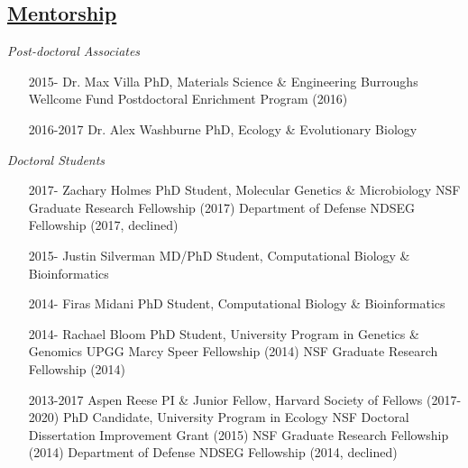 \documentclass[overlapped,line,11pt]{res}
\begin{document}
\begin{resume}
\section{\underline{\sc Mentorship}}
\vspace{.1in}

\emph{Post-doctoral Associates}
\vspace{.1in}

\begin{itemize}[leftmargin=2cm, style=sameline, itemsep=0mm]

\item[2015-] Dr. Max Villa \newline 
  PhD, Materials Science \& Engineering \newline
  Burroughs Wellcome Fund Postdoctoral Enrichment Program (2016)
\item[2016-2017] Dr. Alex Washburne \newline 
  PhD, Ecology \& Evolutionary Biology 
  
  
\end{itemize}

\vspace{-.1in}
\emph{Doctoral Students}
\vspace{.1in}

\begin{itemize}[leftmargin=2cm, style=sameline, itemsep=0mm]

\item[2017-] Zachary Holmes \newline 
  PhD Student, Molecular Genetics \& Microbiology \newline
  NSF Graduate Research Fellowship (2017) \newline
  Department of Defense NDSEG Fellowship (2017, declined) 
\item[2015-] Justin Silverman \newline 
  MD/PhD Student, Computational Biology \& Bioinformatics
\item[2014-] Firas Midani \newline 
  PhD Student, Computational Biology \& Bioinformatics
\item[2014-] Rachael Bloom \newline 
  PhD Student, University Program in Genetics \& Genomics \newline
  UPGG Marcy Speer Fellowship (2014) \newline
  NSF Graduate Research Fellowship (2014)
\item[2013-2017] Aspen Reese \newline 
  PI \& Junior Fellow, Harvard Society of Fellows (2017-2020)\newline
  PhD Candidate, University Program in Ecology \newline
  NSF Doctoral Dissertation Improvement Grant (2015) \newline
  NSF Graduate Research Fellowship (2014) \newline
  Department of Defense NDSEG Fellowship (2014, declined)
\end{itemize}


\end{resume}
\end{document}
